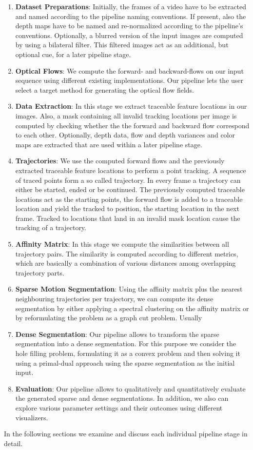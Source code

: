 \begin{enumerate}
\item \textbf{Dataset Preparations}: Initially, the frames of a video have to be extracted and named according to the pipeline naming conventions. If present, also the depth maps have to be named and re-normalized according to the pipeline's conventions. Optionally, a blurred version of the input images are computed by using a bilateral filter. This filtered images act as an additional, but optional cue, for a later pipeline stage. 
\item \textbf{Optical Flows}: We compute the forward- and backward-flows on our input sequence using different existing implementations. Our pipeline lets the user select a target method for generating the optical flow fields.
\item \textbf{Data Extraction}: In this stage we extract traceable feature locations in our images. Also, a mask containing all invalid tracking locations per image is computed by checking whether the the forward and backward flow correspond to each other. Optionally, depth data, flow and depth variances and color maps are extracted that are used within a later pipeline stage. 
\item \textbf{Trajectories}: We use the computed forward flows and the previously extracted traceable feature locations to perform a point tracking. A sequence of traced points form a so called trajectory. In every frame a trajectory can either be started, ended or be continued. The previously computed traceable locations act as the starting points, the forward flow is added to a traceable location and yield the tracked to position, the starting location in the next frame. Tracked to locations that land in an invalid mask location cause the tracking of a trajectory. 
\item \textbf{Affinity Matrix}: In this stage we compute the similarities between all trajectory pairs. The similarity is computed according to different metrics, which are basically a combination of various distances among overlapping trajectory parts. 
\item \textbf{Sparse Motion Segmentation}: Using the affinity matrix plus the nearest neighbouring trajectories per trajectory, we can compute its dense segmentation by either applying a spectral clustering on the affinity matrix or by reformulating the problem as a graph cut problem. Usually 
\item \textbf{Dense Segmentation}: Our pipeline allows to transform the sparse segmentation into a dense segmentation. For this purpose we consider the hole filling problem, formulating it as a convex problem and then solving it using a primal-dual approach using the sparse segmentation as the initial input.
\item \textbf{Evaluation}: Our pipeline allows to qualitatively and quantitatively evaluate the generated sparse and dense segmentations. In addition, we also can explore various parameter settings and their outcomes using different visualizers.
\end{enumerate}
In the following sections we examine and discuss each individual pipeline stage in detail. 

